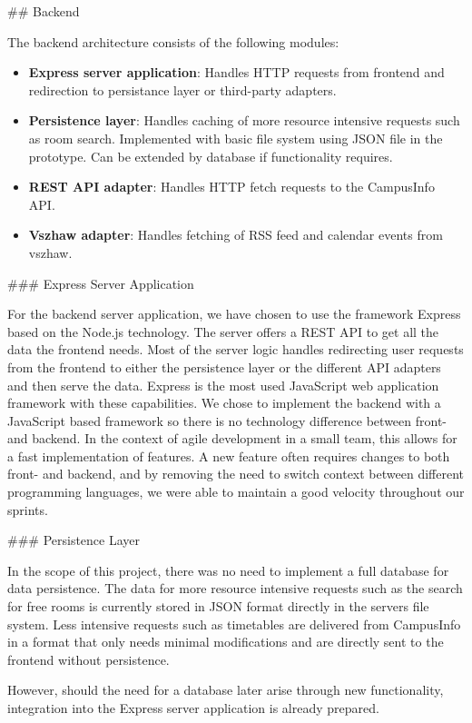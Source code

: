 \begin{markdown}
## Backend

The backend architecture consists of the following modules:

\begin{itemize}
  \item \textbf{Express server application}: Handles HTTP requests from frontend and redirection to persistance layer or third-party adapters.
  \item \textbf{Persistence layer}: Handles caching of more resource intensive requests such as room search. Implemented with basic file system using JSON file in the prototype. Can be extended by database if functionality requires.
  \item \textbf{REST API adapter}: Handles HTTP fetch requests to the CampusInfo API.
  \item \textbf{Vszhaw adapter}: Handles fetching of RSS feed and calendar events from vszhaw.
\end{itemize}

### Express Server Application

For the backend server application, we have chosen to use the framework Express \cite{Express} based on the Node.js \cite{Node} technology. The server offers a REST API to get all the data the frontend needs. Most of the server logic handles redirecting user requests from the frontend to either the persistence layer or the different API adapters and then serve the data. Express is the most used JavaScript web application framework with these capabilities. We chose to implement the backend with a JavaScript based framework so there is no technology difference between front- and backend. In the context of agile development in a small team, this allows for a fast implementation of features. A new feature often requires changes to both front- and backend, and by removing the need to switch context between different programming languages, we were able to maintain a good velocity throughout our sprints.

### Persistence Layer

In the scope of this project, there was no need to implement a full database for data persistence. The data for more resource intensive requests such as the search for free rooms is currently stored in JSON format directly in the servers file system. Less intensive requests such as timetables are delivered from CampusInfo in a format that only needs minimal modifications and are directly sent to the frontend without persistence.

However, should the need for a database later arise through new functionality, integration into the Express server application is already prepared.


\end{markdown}
